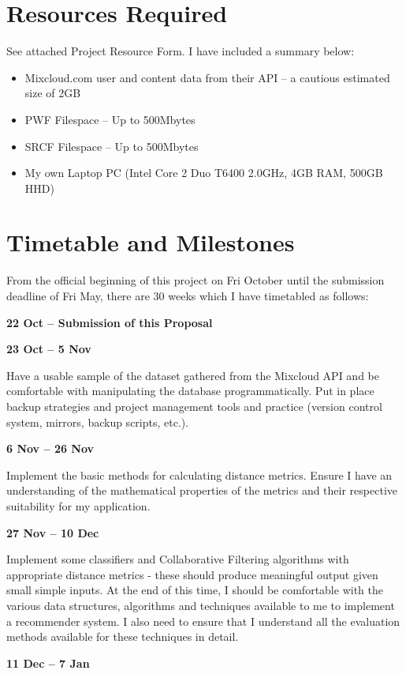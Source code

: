 \section{Resources Required}
See attached Project Resource Form. I have included a summary below:
\begin{itemize}
\item Mixcloud.com user and content data from their API -- a cautious estimated size of 2GB
\item PWF Filespace -- Up to 500Mbytes
\item SRCF Filespace  -- Up to 500Mbytes
\item My own Laptop PC (Intel Core 2 Duo T6400 2.0GHz, 4GB RAM, 500GB HHD)
\end{itemize}

\section{Timetable and Milestones}

From the official beginning of this project on Fri  October until the submission deadline of Fri  May, there are 30 weeks which I have timetabled as follows:

\textbf{22 Oct -- Submission of this Proposal}

\textbf{23 Oct -- 5 Nov}

Have a usable sample of the dataset gathered from the Mixcloud API and be comfortable with manipulating the database programmatically.
Put in place backup strategies and project management tools and practice (version control system, mirrors, backup scripts, etc.).

\textbf{6 Nov -- 26 Nov}

Implement the basic methods for calculating distance metrics.
Ensure I have an understanding of the mathematical properties of the metrics and their respective suitability for my application.

\textbf{27 Nov -- 10 Dec}

Implement some classifiers and Collaborative Filtering algorithms with appropriate distance metrics - these should produce meaningful output given small simple inputs.
At the end of this time, I should be comfortable with the various data structures, algorithms and techniques available to me to implement a recommender system.
I also need to ensure that I understand all the evaluation methods available for these techniques in detail.

\textbf{11 Dec -- 7 Jan}

